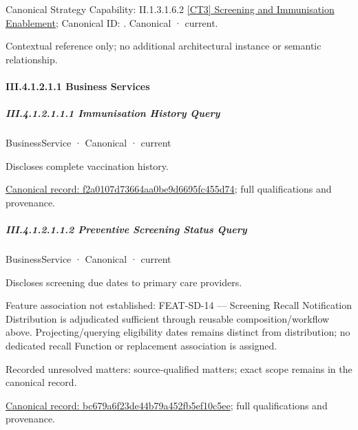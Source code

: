 {\small Canonical Strategy Capability: II.1.3.1.6.2 \hyperref[element:3e9016eaebae4ed0b67a5cacba2652f5]{[CT3] Screening and Immunisation Enablement}; Canonical ID: \texttt{}. Canonical · current.}\par
Contextual reference only; no additional architectural instance or semantic relationship.\par
\paragraph*{III.4.1.2.1.1 Business Services}
\label{navigation:III.4.1.2.1.1}

\subparagraph*{III.4.1.2.1.1.1 Immunisation History Query}
\label{navigation:III.4.1.2.1.1.1}

\label{element:f2a0107d73664aa0be9d6695fc455d74}
{\small BusinessService · Canonical · current}\par

Discloses complete vaccination history.


{\footnotesize \href{../../../../continuum/business/business-service/f2a0107d73664aa0be9d6695fc455d74.md}{Canonical record: f2a0107d73664aa0be9d6695fc455d74}; full qualifications and provenance.}\par
\subparagraph*{III.4.1.2.1.1.2 Preventive Screening Status Query}
\label{navigation:III.4.1.2.1.1.2}

\label{element:bc679a6f23de44b79a452fb5ef10c5ee}
{\small BusinessService · Canonical · current}\par

Discloses screening due dates to primary care providers.



Feature association not established: FEAT-SD-14 — Screening Recall Notification Distribution is adjudicated sufficient through reusable composition/workflow above. Projecting/querying eligibility dates remains distinct from distribution; no dedicated recall Function or replacement association is assigned.


{\small Recorded unresolved matters: source-qualified matters; exact scope remains in the canonical record.}\par
{\footnotesize \href{../../../../continuum/business/business-service/bc679a6f23de44b79a452fb5ef10c5ee.md}{Canonical record: bc679a6f23de44b79a452fb5ef10c5ee}; full qualifications and provenance.}\par
